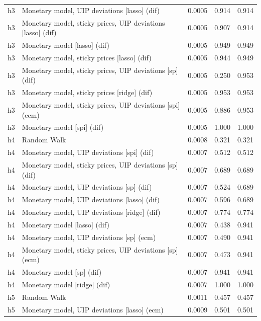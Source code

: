 \begin{ThreePartTable}
\begin{longtable}[t]{cp{5.5cm}ccc}
h3 & \raggedright Monetary model, UIP deviations [lasso] (dif) & 0.0005 & 0.914 & 0.914\\
h3 & \raggedright Monetary model, sticky prices, UIP deviations [lasso] (dif) & 0.0005 & 0.907 & 0.914\\
h3 & \raggedright Monetary model [lasso] (dif) & 0.0005 & 0.949 & 0.949\\
h3 & \raggedright Monetary model, sticky prices [lasso] (dif) & 0.0005 & 0.944 & 0.949\\
h3 & \raggedright Monetary model, sticky prices, UIP deviations [sp] (dif) & 0.0005 & 0.250 & 0.953\\
h3 & \raggedright Monetary model, sticky prices [ridge] (dif) & 0.0005 & 0.953 & 0.953\\
h3 & \raggedright Monetary model, sticky prices, UIP deviations [spi] (ecm) & 0.0005 & 0.886 & 0.953\\
h3 & \raggedright Monetary model [spi] (dif) & 0.0005 & 1.000 & 1.000\\
\addlinespace
h4 & \raggedright Random Walk & 0.0008 & 0.321 & 0.321\\
h4 & \raggedright Monetary model, UIP deviations [spi] (dif) & 0.0007 & 0.512 & 0.512\\
h4 & \raggedright Monetary model, sticky prices, UIP deviations [sp] (dif) & 0.0007 & 0.689 & 0.689\\
h4 & \raggedright Monetary model, UIP deviations [sp] (dif) & 0.0007 & 0.524 & 0.689\\
h4 & \raggedright Monetary model, UIP deviations [lasso] (dif) & 0.0007 & 0.596 & 0.689\\
h4 & \raggedright Monetary model, UIP deviations [ridge] (dif) & 0.0007 & 0.774 & 0.774\\
h4 & \raggedright Monetary model [lasso] (dif) & 0.0007 & 0.438 & 0.941\\
h4 & \raggedright Monetary model, UIP deviations [sp] (ecm) & 0.0007 & 0.490 & 0.941\\
h4 & \raggedright Monetary model, sticky prices, UIP deviations [sp] (ecm) & 0.0007 & 0.473 & 0.941\\
h4 & \raggedright Monetary model [sp] (dif) & 0.0007 & 0.941 & 0.941\\
h4 & \raggedright Monetary model [ridge] (dif) & 0.0007 & 1.000 & 1.000\\
\addlinespace
h5 & \raggedright Random Walk & 0.0011 & 0.457 & 0.457\\
h5 & \raggedright Monetary model, UIP deviations [lasso] (ecm) & 0.0009 & 0.501 & 0.501\\

\end{longtable}
\end{ThreePartTable}
